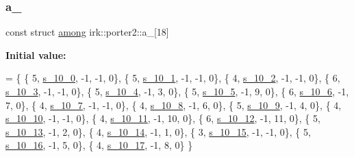 \subsubsection{\texorpdfstring{a\+\_}{a\_10}}
{\footnotesize\ttfamily const struct \mbox{\hyperlink{structirk_1_1porter2_1_1among}{among}} irk\+::porter2\+::a\+\_\mbox{[}18\mbox{]}\hspace{0.3cm}{\ttfamily [static]}}

{\bfseries Initial value\+:}
\begin{DoxyCode}
=
\{
 \{ 5, \mbox{\hyperlink{namespaceirk_1_1porter2_a0495f0cdfa084ce52e230893aaa6865d}{s\_10\_0}}, -1, -1, 0\},
 \{ 5, \mbox{\hyperlink{namespaceirk_1_1porter2_aa24ad57078ee6847b2e714601c39156e}{s\_10\_1}}, -1, -1, 0\},
 \{ 4, \mbox{\hyperlink{namespaceirk_1_1porter2_aca91efef3ffd8d57b872c2c84a8ff9d3}{s\_10\_2}}, -1, -1, 0\},
 \{ 6, \mbox{\hyperlink{namespaceirk_1_1porter2_ab4845b5f9bd66b6005a9ffb570c92f09}{s\_10\_3}}, -1, -1, 0\},
 \{ 5, \mbox{\hyperlink{namespaceirk_1_1porter2_a2e961090a2d9ad73a5fe6f55eb643c13}{s\_10\_4}}, -1, 3, 0\},
 \{ 5, \mbox{\hyperlink{namespaceirk_1_1porter2_a994eee81e891a101a9964501289d054e}{s\_10\_5}}, -1, 9, 0\},
 \{ 6, \mbox{\hyperlink{namespaceirk_1_1porter2_adf90f2a354837a4dc9fab726b0c68c46}{s\_10\_6}}, -1, 7, 0\},
 \{ 4, \mbox{\hyperlink{namespaceirk_1_1porter2_aad94b7f386b742d70253ff102fadb847}{s\_10\_7}}, -1, -1, 0\},
 \{ 4, \mbox{\hyperlink{namespaceirk_1_1porter2_afc930bb9ae5f01a19b24669ad2e58686}{s\_10\_8}}, -1, 6, 0\},
 \{ 5, \mbox{\hyperlink{namespaceirk_1_1porter2_a209afcf6a26c301e27373ef512be74f5}{s\_10\_9}}, -1, 4, 0\},
 \{ 4, \mbox{\hyperlink{namespaceirk_1_1porter2_a0cc125a666fe32a104642aa2b1ef5cde}{s\_10\_10}}, -1, -1, 0\},
 \{ 4, \mbox{\hyperlink{namespaceirk_1_1porter2_ae58c33bdf4b6993e59d6d6ac3e1ea2e4}{s\_10\_11}}, -1, 10, 0\},
 \{ 6, \mbox{\hyperlink{namespaceirk_1_1porter2_abcf778ea1ce2913b1eb6148e1b82a468}{s\_10\_12}}, -1, 11, 0\},
 \{ 5, \mbox{\hyperlink{namespaceirk_1_1porter2_af007d64d58994f033ca88e50df64260a}{s\_10\_13}}, -1, 2, 0\},
 \{ 4, \mbox{\hyperlink{namespaceirk_1_1porter2_a11965394d890f881bf42e2203f197955}{s\_10\_14}}, -1, 1, 0\},
 \{ 3, \mbox{\hyperlink{namespaceirk_1_1porter2_ae49ac1323d41e2aceb5197e8c6318d94}{s\_10\_15}}, -1, -1, 0\},
 \{ 5, \mbox{\hyperlink{namespaceirk_1_1porter2_a8af2bb8d2d0bfbbc87cf6864abdc95ed}{s\_10\_16}}, -1, 5, 0\},
 \{ 4, \mbox{\hyperlink{namespaceirk_1_1porter2_a782b9afe624f49cfbcf5038f1302b698}{s\_10\_17}}, -1, 8, 0\}
\}
\end{DoxyCode}
\mbox{\label{namespaceirk_1_1porter2_a9a1d5fc2582aadc65ff15eb1ea0cba78}} 
